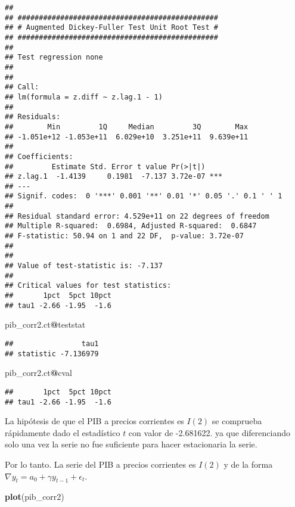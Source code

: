 \documentclass[]{book}
\newenvironment{Shaded}{\begin{snugshade}}{\end{snugshade}}
\newcommand{\KeywordTok}[1]{\textcolor[rgb]{0.13,0.29,0.53}{\textbf{#1}}}
\newcommand{\OperatorTok}[1]{\textcolor[rgb]{0.81,0.36,0.00}{\textbf{#1}}}
\newcommand{\NormalTok}[1]{#1}
\theoremstyle{definition}
\theoremstyle{definition}
\theoremstyle{definition}
\theoremstyle{remark}
\begin{document}
\begin{verbatim}
## 
## ############################################### 
## # Augmented Dickey-Fuller Test Unit Root Test # 
## ############################################### 
## 
## Test regression none 
## 
## 
## Call:
## lm(formula = z.diff ~ z.lag.1 - 1)
## 
## Residuals:
##        Min         1Q     Median         3Q        Max 
## -1.051e+12 -1.053e+11  6.029e+10  3.251e+11  9.639e+11 
## 
## Coefficients:
##         Estimate Std. Error t value Pr(>|t|)    
## z.lag.1  -1.4139     0.1981  -7.137 3.72e-07 ***
## ---
## Signif. codes:  0 '***' 0.001 '**' 0.01 '*' 0.05 '.' 0.1 ' ' 1
## 
## Residual standard error: 4.529e+11 on 22 degrees of freedom
## Multiple R-squared:  0.6984, Adjusted R-squared:  0.6847 
## F-statistic: 50.94 on 1 and 22 DF,  p-value: 3.72e-07
## 
## 
## Value of test-statistic is: -7.137 
## 
## Critical values for test statistics: 
##       1pct  5pct 10pct
## tau1 -2.66 -1.95  -1.6
\end{verbatim}

\begin{Shaded}
\begin{Highlighting}[]
\NormalTok{pib_corr2.ct}\OperatorTok{@}\NormalTok{teststat}
\end{Highlighting}
\end{Shaded}

\begin{verbatim}
##                tau1
## statistic -7.136979
\end{verbatim}

\begin{Shaded}
\begin{Highlighting}[]
\NormalTok{pib_corr2.ct}\OperatorTok{@}\NormalTok{cval}
\end{Highlighting}
\end{Shaded}

\begin{verbatim}
##       1pct  5pct 10pct
## tau1 -2.66 -1.95  -1.6
\end{verbatim}

La hipótesis de que el PIB a precios corrientes es \(I(2)\) se comprueba
rápidamente dado el estadístico \(t\) con valor de -2.681622. ya que
diferenciando solo una vez la serie no fue suficiente para hacer
estacionaria la serie.

Por lo tanto. La serie del PIB a precios corrientes es \(I(2)\) y de la
forma \(\nabla y_t = a_0 + \gamma y_{t-1} + \epsilon_t\).

\begin{Shaded}
\begin{Highlighting}[]
\KeywordTok{plot}\NormalTok{(pib_corr2)}
\end{Highlighting}
\end{Shaded}
\end{document}
